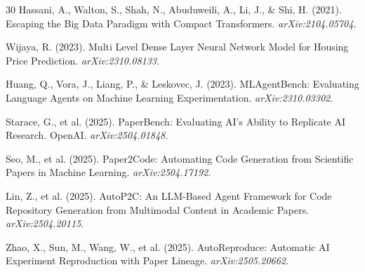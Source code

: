 \documentclass[11pt]{article}
\begin{document}
\begin{thebibliography}{30}
Hassani, A., Walton, S., Shah, N., Abuduweili, A., Li, J., \& Shi, H. (2021).
Escaping the Big Data Paradigm with Compact Transformers. \textit{arXiv:2104.05704}.

Wijaya, R. (2023).
Multi Level Dense Layer Neural Network Model for Housing Price Prediction.
\textit{arXiv:2310.08133}.

Huang, Q., Vora, J., Liang, P., \& Leskovec, J. (2023).
MLAgentBench: Evaluating Language Agents on Machine Learning Experimentation.
\textit{arXiv:2310.03302}.

Starace, G., et al. (2025).
PaperBench: Evaluating AI's Ability to Replicate AI Research. OpenAI.
\textit{arXiv:2504.01848}.

Seo, M., et al. (2025).
Paper2Code: Automating Code Generation from Scientific Papers in Machine Learning.
\textit{arXiv:2504.17192}.

Lin, Z., et al. (2025).
AutoP2C: An LLM-Based Agent Framework for Code Repository Generation from Multimodal Content in
Academic Papers. \textit{arXiv:2504.20115}.

Zhao, X., Sun, M., Wang, W., et al. (2025).
AutoReproduce: Automatic AI Experiment Reproduction with Paper Lineage.
\textit{arXiv:2505.20662}.

\end{thebibliography}
\end{document}

